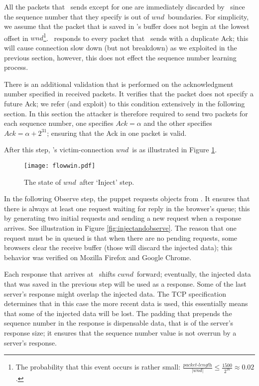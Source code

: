 \documentclass[conference]{IEEEtran}
\newcommand{\wndsize}{$\left|\textit{wnd}\right|$}
\newcommand{\wnd}{$\textit{wnd}$}
\newcommand{\cwnd}{$\textit{cwnd}$}
\begin{document}
All the packets that \mal\ sends except for one are immediately discarded by \wini\ since the sequence number that they specify is out of \wnd\ boundaries. For simplicity, we assume that the packet that is saved in \wini's buffer does not begin at the lowest offset in \wnd\footnote{The probability that this event occurs is rather small: $\frac{\textit{packet-length}}{\text{\wndsize}} \leq \frac{1500}{2^{16}} \approx 0.02$.}. \wini\ responds to every packet that \mal\ sends with a duplicate Ack; this will cause connection slow down (but not breakdown) as we exploited in the previous section, however, this does not effect the sequence number learning process. 

There is an additional validation that is performed on the acknowledgment number specified in received packets. It verifies that the packet does not specify a future Ack; we refer (and exploit) to this condition extensively in the following section. In this section the attacker is therefore required to send two packets for each sequence number, one specifies $\textit{Ack} = \alpha$ and the other specifies $\textit{Ack} = \alpha + 2^{31}$; ensuring that the Ack in one packet is valid.

After this step, \wini's victim-connection \wnd\ is as illustrated in Figure \ref{fig:flowcontrolwin1}. 

\begin{figure}
  \begin{center}
    \texttt{[image: flowwin.pdf]}
  \end{center}
  \caption{The state of \wnd\ after `Inject' step.}
    \label{fig:flowcontrolwin1}
\end{figure}

In the following Observe step, the puppet requests objects from \lin. It ensures that there is always at least one request waiting for reply in the browser's queue; this by generating two initial requests and sending a new request when a response arrives. See illustration in Figure \ref{fig:injectandobserve}. The reason that one request must be in queued is that when there are no pending requests, some browsers clear the receive buffer (those will discard the injected data); this behavior was verified on Mozilla Firefox and Google Chrome. 

Each response that arrives at \wini\ shifts \cwnd\ forward; eventually, the injected data that was saved in the previous step will be used as a response. Some of the last server's response might overlap the injected data. The TCP specification determines that in this case the more recent data is used, this essentially means that some of the injected data will be lost. The padding that prepends the sequence number in the response is dispensable data, that is of the server's response size; it ensures that the sequence number value is not overrun by a server's response. 
\end{document}
